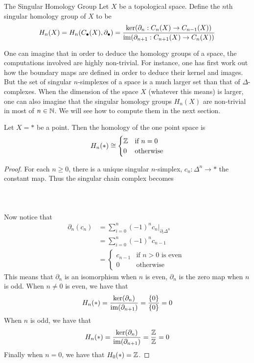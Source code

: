 \documentclass[a4paper]{article}
\begin{document}
\begin{defn}{The Singular Homology Group}{} Let $X$ be a topological space. Define the $n$th singular homology group of $X$ to be $$H_n(X)=H_n(C_\bullet(X),\partial_\bullet)=\frac{\ker(\partial_n:C_n(X)\to C_{n-1}(X))}{\operatorname{im}(\partial_{n+1}:C_{n+1}(X)\to C_n(X))}$$
\end{defn}

One can imagine that in order to deduce the homology groups of a space, the computations involved are highly non-trivial. For instance, one has first work out how the boundary maps are defined in order to deduce their kernel and images. But the set of singular $n$-simplexes of a space is a much larger set than that of $\Delta$-complexes. When the dimension of the space $X$ (whatever this means) is larger, one can also imagine that the singular homology groups $H_n(X)$ are non-trivial in most of $n\in\mathbb{N}$. We will see how to compute them in the next section. 

\begin{eg}{}{} Let $X=\ast$ be a point. Then the homology of the one point space is $$H_n(\ast)\cong\begin{cases}
\mathbb{Z} & \text{if } n=0\\
0 & \text{otherwise}
\end{cases}$$ \tcbline
\begin{proof}
For each $n\geq 0$, there is a unique singular $n$-simplex, $c_n:\Delta^n\to\ast$ the constant map. Thus the singular chain complex becomes \\~\\
\\~\\
Now notice that 
\begin{align*}
\partial_n(c_n)&=\sum_{i=0}^n(-1)^nc_n|_{\partial_i\Delta^n}\\
&=\sum_{i=0}^n(-1)^nc_{n-1}\\
&=\begin{cases}
c_{n-1} & \text{if } n>0\text{ is even }\\
0 & \text{otherwise }
\end{cases}
\end{align*}
This means that $\partial_n$ is an isomorphism when $n$ is even, $\partial_n$ is the zero map when $n$ is odd. When $n\neq 0$ is even, we have that $$H_n(\ast)=\frac{\ker(\partial_n)}{\operatorname{im}(\partial_{n+1})}=\frac{\{0\}}{\{0\}}=0$$ When $n$ is odd, we have that $$H_n(\ast)=\frac{\ker(\partial_n)}{\operatorname{im}(\partial_{n+1})}=\frac{\mathbb{Z}}{\mathbb{Z}}=0$$ Finally when $n=0$, we have that $H_0(\ast)=\mathbb{Z}$. 
\end{proof}
\end{eg}
\end{document}
